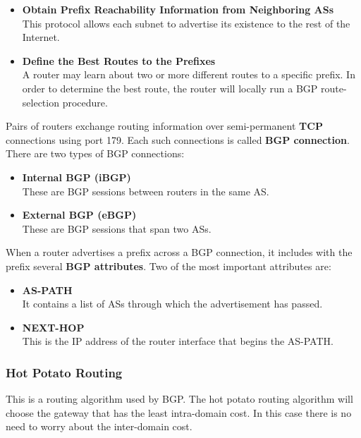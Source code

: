 \documentclass{article}
\begin{document}
\begin{itemize}
	\item \textbf{Obtain Prefix Reachability Information from Neighboring ASs}
	\vspace{.2cm} \\
	This protocol allows each subnet to advertise its existence to the rest of the Internet.
	
	\item \textbf{Define the Best Routes to the Prefixes}
	\vspace{.2cm} \\
	A router may learn about two or more different routes to a specific prefix. In order to determine the best route, the router will locally run a BGP route-selection procedure.
\end{itemize}
Pairs of routers exchange routing information over semi-permanent \textbf{TCP} connections using port 179. Each such connections is called \textbf{BGP connection}. There are two types of BGP connections:

\begin{itemize}
	\item \textbf{Internal BGP (iBGP)}
	\vspace{.2cm} \\
	These are BGP sessions between routers in the same AS.
	
	\item \textbf{External BGP (eBGP)}
	\vspace{.2cm} \\
	These are BGP sessions that span two ASs.
\end{itemize}
When a router advertises a prefix across a BGP connection, it includes with the prefix several \textbf{BGP attributes}. Two of the most important attributes are:

\begin{itemize}
	\item \textbf{AS-PATH}
	\vspace{.2cm} \\
	It contains a list of ASs through which the advertisement has passed.
	
	\item \textbf{NEXT-HOP}
	\vspace{.2cm} \\
	This is the IP address of the router interface that begins the AS-PATH.
\end{itemize}

\subsubsection{Hot Potato Routing}
This is a routing algorithm used by BGP. The hot potato routing algorithm will choose the gateway that has the least intra-domain cost. In this case there is no need to worry about the inter-domain cost.
\end{document}
